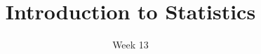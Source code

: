\title{Introduction to Statistics}
\date{Week 13}





\thispagestyle{plain}
\graphicspath{{lectures/week12/}}




